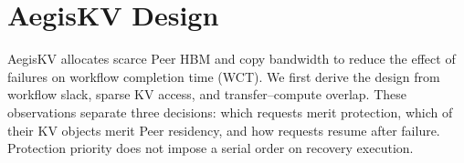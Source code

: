 \section{AegisKV Design}
\label{sec:design}

AegisKV allocates scarce Peer HBM and copy bandwidth to reduce the
effect of failures on workflow completion time (WCT).
We first derive the design from workflow slack, sparse KV access, and
transfer--compute overlap. These observations separate three decisions:
which requests merit protection, which of their KV objects merit Peer
residency, and how requests resume after failure. Protection priority
does not impose a serial order on recovery execution.









